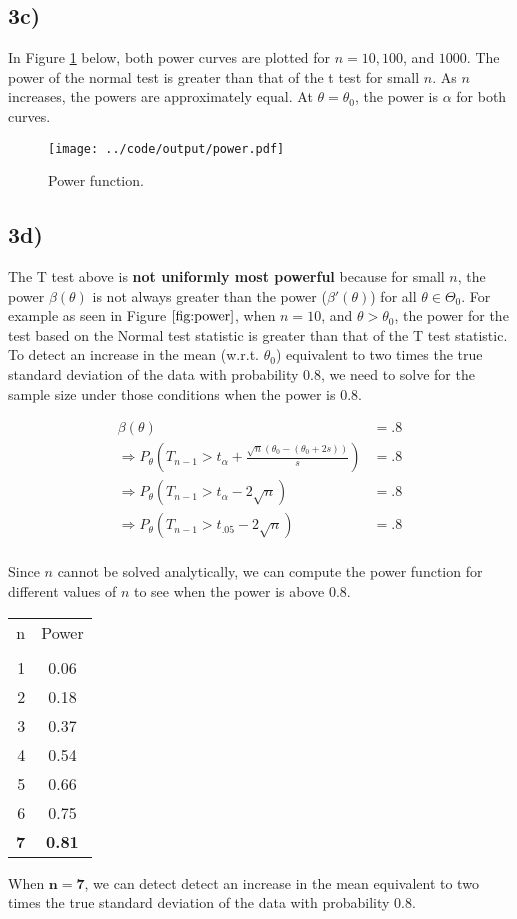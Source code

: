 \documentclass[11pt]{article}
\def\beginmyfig{\begin{figure}[H]\center} %
\def\endmyfig{\end{figure}}
\def\hline{ \textcolor{lgrey}{\hrulefill} }
\begin{document}
\subsection*{3c)}
In Figure \ref{fig:power} below, both power curves are plotted for $n=10,100$, and $1000$. The power of the normal
test is greater than that of the t test for small $n$. As $n$ increases, the powers are approximately equal. At 
$\theta = \theta_0$, the power is $\alpha$ for both curves.

\beginmyfig
  \texttt{[image: ../code/output/power.pdf]}
  \caption{\small Power function.}
  \label{fig:power}
\endmyfig

\subsection*{3d)}
The T test above is \textbf{not uniformly most powerful} because for small $n$,
the power $\beta(\theta)$ is not always greater than the power
($\beta'(\theta)$) for all $\theta \in \Theta_0$. For example as seen in Figure
$\ref{fig:power}$, when $n=10$, and $\theta > \theta_0$, the power for the test
based on the Normal test statistic is greater than that of the T test
statistic. \\

\noindent
To detect an increase in the mean (w.r.t. $\theta_0$) equivalent to two times
the true standard deviation of the data with probability 0.8, we need to solve
for the sample size under those conditions when the power is 0.8.

\[
\begin{aligned}
  \beta(\theta) &= .8 \\
  \Rightarrow P_\theta(T_{n-1} > t_\alpha + \frac{\sqrt{n} (\theta_0-(\theta_0+2s))}{s}) &= .8\\
  \Rightarrow P_\theta(T_{n-1} > t_\alpha - 2\sqrt{n}) &= .8\\
  \Rightarrow P_\theta(T_{n-1} > t_{.05} - 2\sqrt{n}) &= .8\\
\end{aligned}
\]

\noindent
Since $n$ cannot be solved analytically, we can compute the power function for different values of $n$ to see
when the power is above 0.8.

\begin{table}[ht]
\centering
\begin{tabular}{rc}
  n & Power \\ 
  \hline & \hline \\
  1 & 0.06 \\ 
  2 & 0.18 \\ 
  3 & 0.37 \\ 
  4 & 0.54 \\ 
  5 & 0.66 \\ 
  6 & 0.75 \\ 
  \textbf 7 & \textbf{0.81} \\ 
\end{tabular}
\end{table}

\noindent
When $\mathbf{n=7}$, we can detect detect an increase in the mean equivalent to two
times the true standard deviation of the data with probability 0.8.
\end{document}
